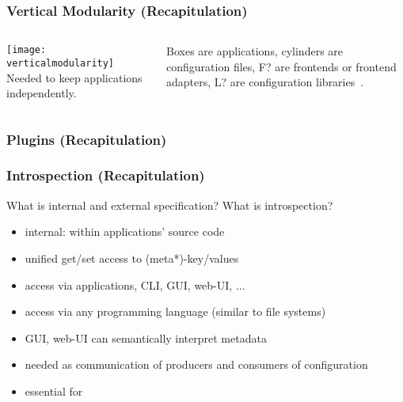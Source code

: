 \begin{frame}
	\frametitle{Vertical Modularity (Recapitulation)}
	\begin{columns}[c]
	\column{7cm}
	\texttt{[image: verticalmodularity]}
	\column{4cm}
	Needed to keep applications independently.

	Boxes are applications, cylinders are configuration files, F? are frontends or frontend adapters, L? are configuration libraries~\cite{raab2016improving}.
	\end{columns}
\end{frame}

\begin{frame}
	\frametitle{Plugins (Recapitulation)}
	\pause
	\Large
\end{frame}


\begin{frame}
	\frametitle{Introspection (Recapitulation)}
	\begin{task}
	What is internal and external specification?
	What is introspection?
	\end{task}

	\pause
	\vspace{1em}

	\begin{itemize}
	\item internal: within applications' source code
	\item unified get/set access to (meta*)-key/values
	\item access via applications, CLI, GUI, web-UI, ...
	\item access via any programming language (similar to file systems)
	\item GUI, web-UI can semantically interpret metadata
	\item needed as communication of producers and consumers of configuration
	\item essential for ~\citet{holland2001nofutz}
	\end{itemize}
\end{frame}

